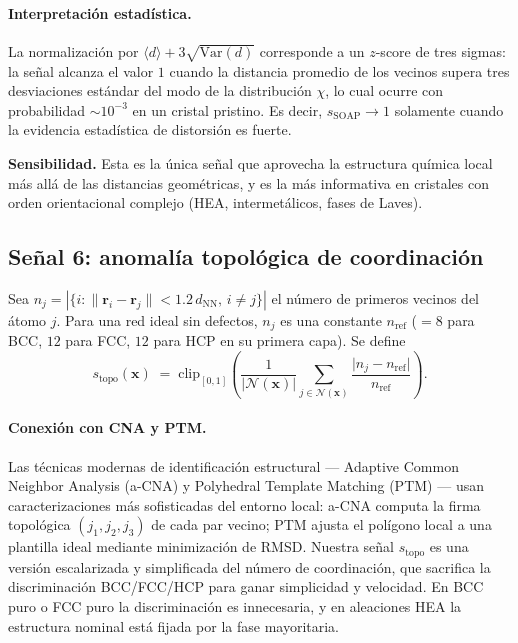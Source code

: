 \documentclass[11pt,a4paper]{article}
\theoremstyle{remark}
\begin{document}
\paragraph{Interpretación estadística.} La normalización por
$\langle d \rangle + 3\sqrt{\mathrm{Var}(d)}$ corresponde a un
$z$-score de tres sigmas: la señal alcanza el valor $1$ cuando la
distancia promedio de los vecinos supera tres desviaciones estándar
del modo de la distribución $\chi$, lo cual ocurre con probabilidad
$\sim 10^{-3}$ en un cristal pristino. Es decir, $s_\text{SOAP} \to 1$
solamente cuando la evidencia estadística de distorsión es fuerte.

\textbf{Sensibilidad.} Esta es la única señal que aprovecha la
estructura química local más allá de las distancias geométricas, y
es la más informativa en cristales con orden orientacional complejo
(HEA, intermetálicos, fases de Laves).

\subsection{Señal 6: anomalía topológica de coordinación}
\label{sec:sig-topology}

Sea $n_j = |\{i : \|\mathbf{r}_i - \mathbf{r}_j\| < 1.2\,d_\text{NN},
\, i\neq j\}|$ el número de primeros vecinos del átomo $j$. Para una
red ideal sin defectos, $n_j$ es una constante $n_\text{ref}$ ($=8$
para BCC, $12$ para FCC, $12$ para HCP en su primera capa). Se define
\begin{equation}
  s_\text{topo}(\mathbf{x}) \;=\; \mathrm{clip}_{[0,1]}\!\left(
  \frac{1}{|\mathcal{N}(\mathbf{x})|}
  \sum_{j \in \mathcal{N}(\mathbf{x})}
  \frac{\bigl|n_j - n_\text{ref}\bigr|}{n_\text{ref}}\right).
  \label{eq:sig-topo}
\end{equation}

\paragraph{Conexión con CNA y PTM.} Las técnicas modernas de
identificación estructural --- Adaptive Common Neighbor Analysis
(a-CNA) \cite{Stukowski2012} y Polyhedral Template Matching
(PTM) \cite{Larsen2016} --- usan caracterizaciones más sofisticadas
del entorno local: a-CNA computa la firma topológica
$(j_1, j_2, j_3)$ de cada par vecino; PTM ajusta el polígono local a
una plantilla ideal mediante minimización de RMSD. Nuestra señal
$s_\text{topo}$ es una versión escalarizada y simplificada del
número de coordinación, que sacrifica la discriminación BCC/FCC/HCP
para ganar simplicidad y velocidad. En BCC puro o FCC puro la
discriminación es innecesaria, y en aleaciones HEA la estructura
nominal está fijada por la fase mayoritaria.
\end{document}
